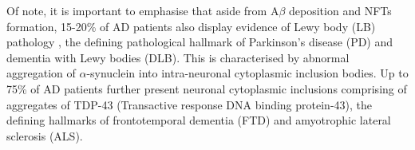 Of note, it is important to emphasise that aside from A$\beta$ deposition and NFTs formation, 15-20\% of AD patients also display evidence of Lewy body (LB) pathology \cite{C1995,L2003}, the defining pathological hallmark of Parkinson's disease (PD)\cite{Wakabayashi2007} and dementia with Lewy bodies (DLB)\cite{Spillantini1997}. This is characterised by abnormal aggregation of $\alpha$-synuclein into intra-neuronal cytoplasmic inclusion bodies. Up to 75\% of AD patients further present neuronal cytoplasmic inclusions comprising of aggregates of TDP-43 \cite{King2010,McAleese2017,Arai2009} (Transactive response DNA binding protein-43), the defining hallmarks of frontotemporal dementia (FTD) and amyotrophic lateral sclerosis\cite{Pesiridis2009} (ALS).

